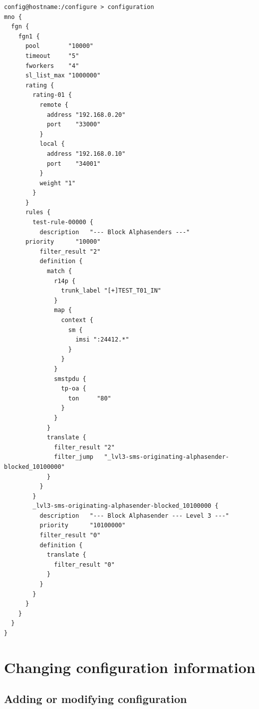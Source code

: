 \documentclass[a4paper,latin]{paper}
\begin{document}
\begin{lstlisting}[style=BashInputStyle]
config@hostname:/configure > configuration
mno {
  fgn {
    fgn1 {
      pool        "10000"
      timeout     "5"
      fworkers    "4"
      sl_list_max "1000000"
      rating {
        rating-01 {
          remote {
            address "192.168.0.20"
            port    "33000"
          }
          local {
            address "192.168.0.10"
            port    "34001"
          }
          weight "1"
        }
      }
      rules {
        test-rule-00000 {
          description   "--- Block Alphasenders ---"
	  priority      "10000"
          filter_result "2"
          definition {
            match {
              r14p {
                trunk_label "[+]TEST_T01_IN"
              }
              map {
                context {
                  sm {
                    imsi ":24412.*"
                  }
                }
              }
              smstpdu {
                tp-oa {
                  ton     "80"
                }
              }
            }
            translate {
              filter_result "2"
              filter_jump   "_lvl3-sms-originating-alphasender-blocked_10100000"
            }
          }
        }
        _lvl3-sms-originating-alphasender-blocked_10100000 {
          description   "--- Block Alphasender --- Level 3 ---"
          priority      "10100000"
          filter_result "0"
          definition {
            translate {
              filter_result "0"
            }
          }
        }
      }
    }
  }
}

\end{lstlisting}

\section{Changing configuration information}

\subsection{Adding or modifying configuration}
\end{document}
